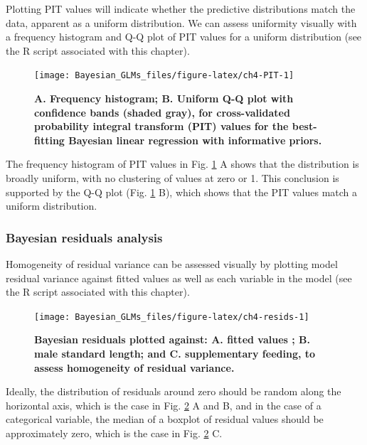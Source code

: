\documentclass[
]{book}
\begin{document}
Plotting PIT values will indicate whether the predictive distributions match the data, apparent as a uniform distribution. We can assess uniformity visually with a frequency histogram and Q-Q plot of PIT values for a uniform distribution (see the R script associated with this chapter).



\begin{figure}

{\centering \texttt{[image: Bayesian\_GLMs\_files/figure-latex/ch4-PIT-1]} 

}

\caption{\textbf{A. Frequency histogram; B. Uniform Q-Q plot with confidence bands (shaded gray), for cross-validated probability integral transform (PIT) values for the best-fitting Bayesian linear regression with informative priors.}}\label{fig:ch4-PIT}
\end{figure}

The frequency histogram of PIT values in Fig. \ref{fig:ch4-PIT} A shows that the distribution is broadly uniform, with no clustering of values at zero or 1. This conclusion is supported by the Q-Q plot (Fig. \ref{fig:ch4-PIT} B), which shows that the PIT values match a uniform distribution.

\hypertarget{bayesian-residuals-analysis}{%
\subsubsection{Bayesian residuals analysis}\label{bayesian-residuals-analysis}}

Homogeneity of residual variance can be assessed visually by plotting model residual variance against fitted values as well as each variable in the model (see the R script associated with this chapter).



\begin{figure}

{\centering \texttt{[image: Bayesian\_GLMs\_files/figure-latex/ch4-resids-1]} 

}

\caption{\textbf{Bayesian residuals plotted against: A. fitted values ; B. male standard length; and C. supplementary feeding, to assess homogeneity of residual variance.}}\label{fig:ch4-resids}
\end{figure}

Ideally, the distribution of residuals around zero should be random along the horizontal axis, which is the case in Fig. \ref{fig:ch4-resids} A and B, and in the case of a categorical variable, the median of a boxplot of residual values should be approximately zero, which is the case in Fig. \ref{fig:ch4-resids} C.
\end{document}
